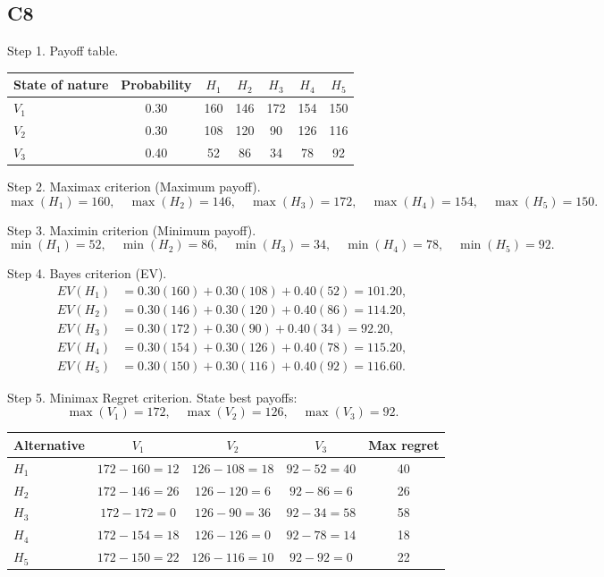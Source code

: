 \begin{ExamProblems}
		\subsection*{C8}
		Step 1. Payoff table.
		\begin{center}
			\begin{tabular}{l c c c c c c}
				\toprule
				State of nature & Probability & $H_1$ & $H_2$ & $H_3$ & $H_4$ & $H_5$ \\
				\midrule
				$V_1$ & 0.30 & 160 & 146 & 172 & 154 & 150 \\
				$V_2$ & 0.30 & 108 & 120 & 90 & 126 & 116 \\
				$V_3$ & 0.40 & 52 & 86 & 34 & 78 & 92 \\
				\bottomrule
			\end{tabular}
		\end{center}

		Step 2. Maximax criterion (Maximum payoff).
		\[
		\max(H_1)=160,\quad \max(H_2)=146,\quad \max(H_3)=172,\quad \max(H_4)=154,\quad \max(H_5)=150.
		\]

		Step 3. Maximin criterion (Minimum payoff).
		\[
		\min(H_1)=52,\quad \min(H_2)=86,\quad \min(H_3)=34,\quad \min(H_4)=78,\quad \min(H_5)=92.
		\]

		Step 4. Bayes criterion (EV).
		\[
		\begin{aligned}
		EV(H_1)&=0.30(160)+0.30(108)+0.40(52)=101.20,\\
		EV(H_2)&=0.30(146)+0.30(120)+0.40(86)=114.20,\\
		EV(H_3)&=0.30(172)+0.30(90)+0.40(34)=92.20,\\
		EV(H_4)&=0.30(154)+0.30(126)+0.40(78)=115.20,\\
		EV(H_5)&=0.30(150)+0.30(116)+0.40(92)=116.60.
		\end{aligned}
		\]

		Step 5. Minimax Regret criterion.
		State best payoffs:
		\[
		\max(V_1)=172,\quad \max(V_2)=126,\quad \max(V_3)=92.
		\]
		\begin{center}
			\begin{tabular}{l c c c c}
				\toprule
				Alternative & $V_1$ & $V_2$ & $V_3$ & Max regret \\
				\midrule
				$H_1$ & $172-160=12$ & $126-108=18$ & $92-52=40$ & 40 \\
				$H_2$ & $172-146=26$ & $126-120=6$ & $92-86=6$ & 26 \\
				$H_3$ & $172-172=0$ & $126-90=36$ & $92-34=58$ & 58 \\
				$H_4$ & $172-154=18$ & $126-126=0$ & $92-78=14$ & 18 \\
				$H_5$ & $172-150=22$ & $126-116=10$ & $92-92=0$ & 22 \\
				\bottomrule
			\end{tabular}
		\end{center}


\end{ExamProblems}
